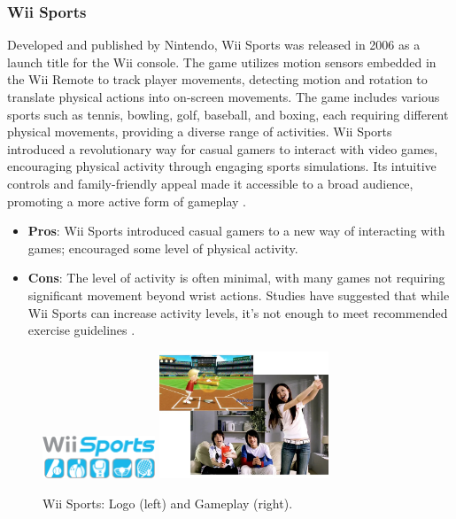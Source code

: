 \documentclass[12pt]{article}
\begin{document}
\subsubsection{Wii Sports}
Developed and published by Nintendo, Wii Sports was released in 2006 as a launch title for the Wii console. The game utilizes motion sensors embedded in the Wii Remote to track player movements, detecting motion and rotation to translate physical actions into on-screen movements. The game includes various sports such as tennis, bowling, golf, baseball, and boxing, each requiring different physical movements, providing a diverse range of activities. Wii Sports introduced a revolutionary way for casual gamers to interact with video games, encouraging physical activity through engaging sports simulations. Its intuitive controls and family-friendly appeal made it accessible to a broad audience, promoting a more active form of gameplay \cite{wiisports2007}.
\begin{itemize}
\item \textbf{Pros}: Wii Sports introduced casual gamers to a new way of interacting with games; encouraged some level of physical activity.
\item \textbf{Cons}: The level of activity is often minimal, with many games not requiring significant movement beyond wrist actions. Studies have suggested that while Wii Sports can increase activity levels, it's not enough to meet recommended exercise guidelines \cite{sherbal2020}.
\end{itemize}
\begin{figure}[ht]
\centering
\includegraphics[width=0.3\textwidth]{logo-wii.png}
\includegraphics[width=0.45\textwidth]{Market-Wii.jpg}
\caption{Wii Sports: Logo (left) and Gameplay (right).}
\end{figure}
\end{document}
